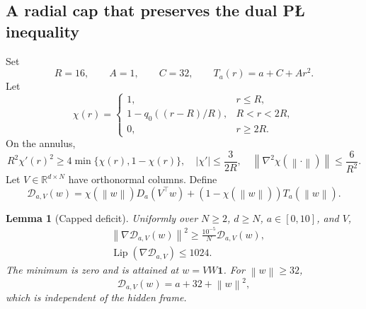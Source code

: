 \documentclass[11pt,a4paper]{article}
\newcommand{\R}{\mathbb R}
\newcommand{\norm}[1]{\left\lVert #1\right\rVert}
\newcommand{\one}{\mathbf 1}
\newcommand{\Lip}{\operatorname{Lip}}
\newtheorem{lemma}[theorem]{Lemma}
\theoremstyle{definition}
\theoremstyle{remark}
\numberwithin{equation}{section}
\begin{document}
\subsection{A radial cap that preserves the dual P\L{} inequality}
\label{sec:cap}

Set
\begin{equation}
 R=16,
 \qquad A=1,
 \qquad C=32,
 \qquad T_a(r)=a+C+Ar^2.
 \label{eq:cap-constants}
\end{equation}
Let
\[
 \chi(r)=
 \begin{cases}
 1,&r\le R,\\
 1-q_0((r-R)/R),&R<r<2R,\\
 0,&r\ge2R.
 \end{cases}
\]
On the annulus,
\begin{equation}
 R^2\chi'(r)^2\ge4\min\{\chi(r),1-\chi(r)\},
 \quad
 |\chi'|\le\frac{3}{2R},
 \quad
 \norm{\nabla^2\chi(\norm\cdot)}\le\frac6{R^2}.
 \label{eq:chi-ledger}
\end{equation}
Let $V\in\R^{d\times N}$ have orthonormal columns.  Define
\begin{equation}
 \mathscr D_{a,V}(w)
 =\chi(\norm w)D_a(V^\top w)
 +(1-\chi(\norm w))T_a(\norm w).
 \label{eq:capped-deficit}
\end{equation}

\begin{lemma}[Capped deficit]
\label{lem:cap}
Uniformly over $N\ge2$, $d\ge N$, $a\in[0,10]$, and $V$,
\begin{align}
 &\norm{\nabla\mathscr D_{a,V}(w)}^2
 \ge\frac{10^{-5}}{N}\mathscr D_{a,V}(w),
 \label{eq:cap-pl}\\
 &\Lip(\nabla\mathscr D_{a,V})\le1024.
 \label{eq:cap-smooth}
\end{align}
The minimum is zero and is attained at $w=VW\one$.  For $\norm w\ge32$,
\begin{equation}
 \mathscr D_{a,V}(w)=a+32+\norm w^2,
 \label{eq:public-tail}
\end{equation}
which is independent of the hidden frame.
\end{lemma}
\end{document}
